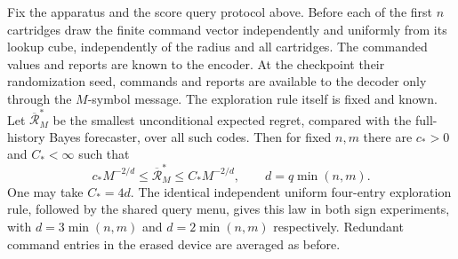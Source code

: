\begin{theorem}\label{thm:average-memory-rate}
Fix the apparatus and the score query protocol above. Before each of the
first $n$ cartridges draw the finite command vector independently and
uniformly from its lookup cube, independently of the radius and all
cartridges. The commanded values and reports are known to the encoder.
At the checkpoint their randomization seed, commands and reports are
available to the decoder only through the $M$-symbol message. The
exploration rule itself is fixed and known. Let $\overline{\mathcal R}_M^*$
be the smallest unconditional expected regret, compared with the
full-history Bayes forecaster, over all such codes. Then for fixed $n,m$
there are $c_*>0$ and $C_*<\infty$ such that
\begin{equation}\label{eq:average-memory-law}
 c_*M^{-2/d}\le\overline{\mathcal R}_M^*\le C_*M^{-2/d},
 \qquad d=q\min(n,m).
\end{equation}
One may take $C_*=4d$. The identical independent uniform four-entry
exploration rule, followed by the shared query menu, gives this law in
both sign experiments, with $d=3\min(n,m)$ and $d=2\min(n,m)$ respectively.
Redundant command entries in the erased device are averaged as before.
\end{theorem}
